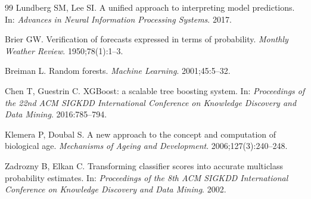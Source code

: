 \documentclass[11pt,a4paper]{article}
\begin{document}
\begin{thebibliography}{99}
 Lundberg SM, Lee SI. A unified approach to interpreting model predictions. In: \textit{Advances in Neural Information Processing Systems}. 2017.

 Brier GW. Verification of forecasts expressed in terms of probability. \textit{Monthly Weather Review}. 1950;78(1):1--3.

 Breiman L. Random forests. \textit{Machine Learning}. 2001;45:5--32.

 Chen T, Guestrin C. XGBoost: a scalable tree boosting system. In: \textit{Proceedings of the 22nd ACM SIGKDD International Conference on Knowledge Discovery and Data Mining}. 2016:785--794.

 Klemera P, Doubal S. A new approach to the concept and computation of biological age. \textit{Mechanisms of Ageing and Development}. 2006;127(3):240--248.

 Zadrozny B, Elkan C. Transforming classifier scores into accurate multiclass probability estimates. In: \textit{Proceedings of the 8th ACM SIGKDD International Conference on Knowledge Discovery and Data Mining}. 2002.

\end{thebibliography}
\end{document}
